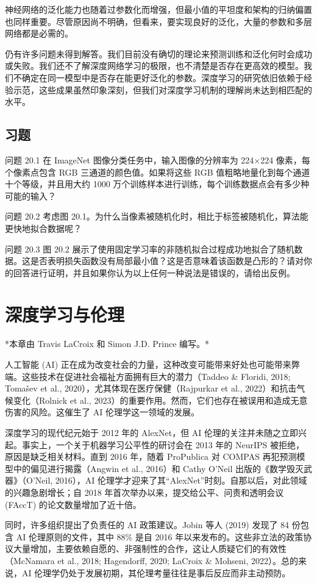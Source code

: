 \documentclass[lang=cn,newtx,10pt,scheme=chinese]{elegantbook}
\begin{document}
神经网络的泛化能力也随着过参数化而增强，但最小值的平坦度和架构的归纳偏置也同样重要。尽管原因尚不明确，但看来，要实现良好的泛化，大量的参数和多层网络都是必需的。

仍有许多问题未得到解答。我们目前没有确切的理论来预测训练和泛化何时会成功或失败。我们还不了解深度网络学习的极限，也不清楚是否存在更高效的模型。我们不确定在同一模型中是否存在能更好泛化的参数。深度学习的研究依旧依赖于经验示范，这些成果虽然印象深刻，但我们对深度学习机制的理解尚未达到相匹配的水平。

\section{习题}
问题 20.1 在 ImageNet 图像分类任务中，输入图像的分辨率为 224×224 像素，每个像素点包含 RGB 三通道的颜色值。如果将这些 RGB 值粗略地量化到每个通道十个等级，并且用大约 1000 万个训练样本进行训练，每个训练数据点会有多少种可能的输入？

问题 20.2 考虑图 20.1。为什么当像素被随机化时，相比于标签被随机化，算法能更快地拟合数据呢？

问题 20.3 图 20.2 展示了使用固定学习率的非随机拟合过程成功地拟合了随机数据。这是否表明损失函数没有局部最小值？这是否意味着该函数是凸形的？请对你的回答进行证明，并且如果你认为以上任何一种说法是错误的，请给出反例。

\chapter{深度学习与伦理}

*本章由 Travis LaCroix 和 Simon J.D. Prince 编写。*

人工智能 (AI) 正在成为改变社会的力量，这种改变可能带来好处也可能带来弊端。这些技术在促进社会福祉方面拥有巨大的潜力（Taddeo \& Floridi, 2018; Tomašev et al., 2020），尤其体现在医疗保健（Rajpurkar et al., 2022）和抗击气候变化（Rolnick et al., 2023）的重要作用。然而，它们也存在被误用和造成无意伤害的风险。这催生了 AI 伦理学这一领域的发展。

深度学习的现代纪元始于 2012 年的 AlexNet，但 AI 伦理的关注并未随之立即兴起。事实上，一个关于机器学习公平性的研讨会在 2013 年的 NeurIPS 被拒绝，原因是缺乏相关材料。直到 2016 年，随着 ProPublica 对 COMPAS 再犯预测模型中的偏见进行揭露（Angwin et al., 2016）和 Cathy O’Neil 出版的《数学毁灭武器》（O’Neil, 2016），AI 伦理学才迎来了其“AlexNet”时刻。自那以后，对此领域的兴趣急剧增长；自 2018 年首次举办以来，提交给公平、问责和透明会议 (FAccT) 的论文数量增加了近十倍。

同时，许多组织提出了负责任的 AI 政策建议。Jobin 等人 (2019) 发现了 84 份包含 AI 伦理原则的文件，其中 88\% 是自 2016 年以来发布的。这些非立法的政策协议大量增加，主要依赖自愿的、非强制性的合作，这让人质疑它们的有效性（McNamara et al., 2018; Hagendorff, 2020; LaCroix \& Mohseni, 2022）。总的来说，AI 伦理学仍处于发展初期，其伦理考量往往是事后反应而非主动预防。
\end{document}
